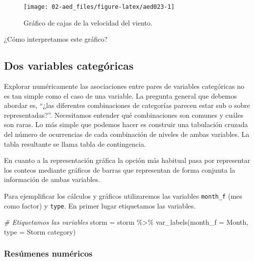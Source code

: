 \documentclass[
]{book}
\newenvironment{Shaded}{\begin{snugshade}}{\end{snugshade}}
\newcommand{\AttributeTok}[1]{\textcolor[rgb]{0.77,0.63,0.00}{#1}}
\newcommand{\CommentTok}[1]{\textcolor[rgb]{0.56,0.35,0.01}{\textit{#1}}}
\newcommand{\FunctionTok}[1]{\textcolor[rgb]{0.00,0.00,0.00}{#1}}
\newcommand{\NormalTok}[1]{#1}
\newcommand{\OtherTok}[1]{\textcolor[rgb]{0.56,0.35,0.01}{#1}}
\newcommand{\SpecialCharTok}[1]{\textcolor[rgb]{0.00,0.00,0.00}{#1}}
\newcommand{\StringTok}[1]{\textcolor[rgb]{0.31,0.60,0.02}{#1}}
\begin{document}
\begin{figure}

{\centering \texttt{[image: 02-aed\_files/figure-latex/aed023-1]} 

}

\caption{Gráfico de cajas de la velocidad del viento.}\label{fig:aed023}
\end{figure}

¿Cómo interpretamos este gráfico?

\hypertarget{dos-variables-categuxf3ricas}{%
\subsection{Dos variables categóricas}\label{dos-variables-categuxf3ricas}}

Explorar numéricamente las asociaciones entre pares de variables categóricas no es tan simple como el caso de una variable. La pregunta general que debemos abordar es, ``¿las diferentes combinaciones de categorías parecen estar sub o sobre representadas?''. Necesitamos entender qué combinaciones son comunes y cuáles son raras. Lo más simple que podemos hacer es construir una tabulación cruzada del número de ocurrencias de cada combinación de niveles de ambas variables. La tabla resultante se llama tabla de contingencia.

En cuanto a la representación gráfica la opción más habitual pasa por representar los conteos mediante gráficos de barras que representan de forma conjunta la información de ambas variables.

Para ejemplificar los cálculos y gráficos utilizaremos las variables \texttt{month\_f} (mes como factor) y \texttt{type}. En primer lugar etiquetamos las variables.

\begin{Shaded}
\begin{Highlighting}[]
\CommentTok{\# Etiquetamos las variables}
\NormalTok{storm }\OtherTok{=}\NormalTok{ storm }\SpecialCharTok{\%\textgreater{}\%} 
  \FunctionTok{var\_labels}\NormalTok{(}\AttributeTok{month\_f =} \StringTok{\textquotesingle{}Month\textquotesingle{}}\NormalTok{, }
             \AttributeTok{type =} \StringTok{\textquotesingle{}Storm category\textquotesingle{}}\NormalTok{)}
\end{Highlighting}
\end{Shaded}

\hypertarget{resuxfamenes-numuxe9ricos-2}{%
\subsubsection{Resúmenes numéricos}\label{resuxfamenes-numuxe9ricos-2}}
\end{document}
